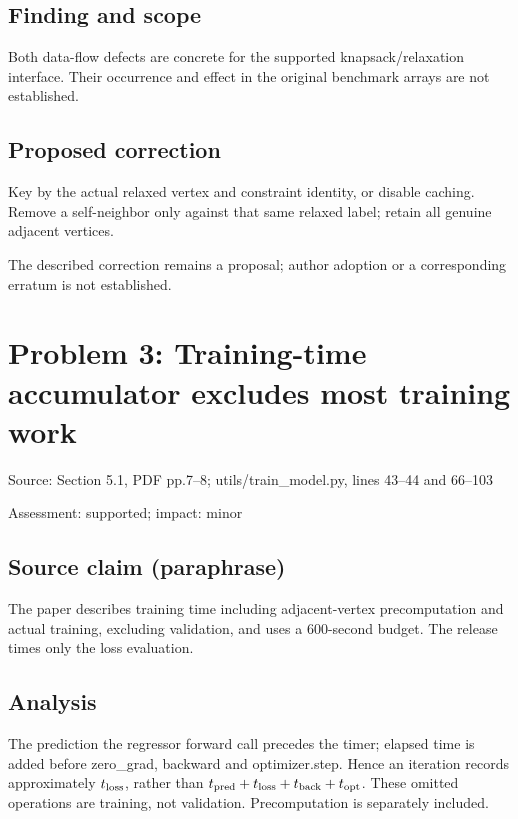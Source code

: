 \documentclass[11pt]{article}
\begin{document}
\subsection*{Finding and scope}

Both data-flow defects are concrete for the supported knapsack/relaxation interface. Their occurrence and effect in the original benchmark arrays are not established.

\subsection*{Proposed correction}

Key by the actual relaxed vertex and constraint identity, or disable caching. Remove a self-neighbor only against that same relaxed label; retain all genuine adjacent vertices.

The described correction remains a proposal; author adoption or a corresponding erratum is not established.

\section*{Problem 3: Training-time accumulator excludes most training work}

Source: Section 5.1, PDF pp.7–8; utils/train\_model.py, lines 43–44 and 66–103

Assessment: supported; impact: minor

\subsection*{Source claim (paraphrase)}

The paper describes training time including adjacent-vertex precomputation and actual training, excluding validation, and uses a \(600\)-second budget. The release times only the loss evaluation.

\subsection*{Analysis}

The prediction the regressor forward call precedes the timer; elapsed time is added before zero\_grad, backward and optimizer.step. Hence an iteration records approximately \(t_{\rm loss}\), rather than \(t_{\rm pred}+t_{\rm loss}+t_{\rm back}+t_{\rm opt}\). These omitted operations are training, not validation. Precomputation is separately included.
\end{document}
